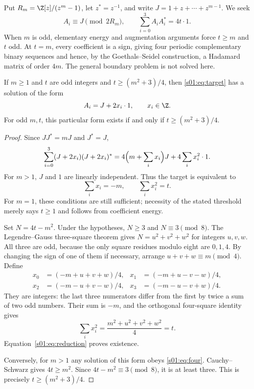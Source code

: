 



Put $R_m=\Z[z]/(z^m-1)$, let $z^*=z^{-1}$, and write
$J=1+z+\cdots+z^{m-1}$. We seek
\begin{equation}\label{s01:eq:target}
 A_i\equiv J\pmod{2R_m},\qquad
 \sum_{i=0}^3A_iA_i^*=4t\cdot1.
\end{equation}
When $m$ is odd, elementary energy and augmentation arguments force
$t\ge m$ and $t$ odd. At $t=m$, every coefficient is a sign, giving
four periodic complementary binary sequences and hence, by the
Goethals--Seidel construction, a Hadamard matrix of order $4m$.
The general boundary problem is not solved here.

\begin{theorem}\label{s01:thm:main}
If $m\ge1$ and $t$ are odd integers and $t\ge(m^2+3)/4$, then
\eqref{s01:eq:target} has a solution of the form
\[
 A_i=J+2x_i\cdot1,\qquad x_i\in\Z.
\]
For odd $m,t$, this particular form exists if and only if
$t\ge(m^2+3)/4$.
\end{theorem}
\begin{proof}
Since $JJ^*=mJ$ and $J^*=J$,
\begin{equation}\label{s01:eq:reduction}
 \sum_{i=0}^3(J+2x_i)(J+2x_i)^*
 =4\Bigl(m+\sum_i x_i\Bigr)J+4\sum_i x_i^2\cdot1.
\end{equation}
For $m>1$, $J$ and $1$ are linearly independent. Thus the target is
equivalent to
\begin{equation}\label{s01:eq:four}
 \sum_i x_i=-m,\qquad \sum_i x_i^2=t.
\end{equation}
For $m=1$, these conditions are still sufficient; necessity of the
stated threshold merely says $t\ge1$ and follows from coefficient energy.

Set $N=4t-m^2$. Under the hypotheses, $N\ge3$ and $N\equiv3\pmod8$.
The Legendre--Gauss three-square theorem gives
$N=u^2+v^2+w^2$ for integers $u,v,w$. All three are odd, because the
only square residues modulo eight are $0,1,4$. By changing the sign of
one of them if necessary, arrange
$u+v+w\equiv m\pmod4$. Define
\begin{align*}
 x_0&=(-m+u+v+w)/4,& x_1&=(-m+u-v-w)/4,\\
 x_2&=(-m-u+v-w)/4,& x_3&=(-m-u-v+w)/4.
\end{align*}
They are integers: the last three numerators differ from the first by
twice a sum of two odd numbers. Their sum is $-m$, and the orthogonal
four-square identity gives
\[
 \sum_i x_i^2=\frac{m^2+u^2+v^2+w^2}{4}=t.
\]
Equation~\eqref{s01:eq:reduction} proves existence.

Conversely, for $m>1$ any solution of this form obeys
\eqref{s01:eq:four}. Cauchy--Schwarz gives $4t\ge m^2$. Since
$4t-m^2\equiv3\pmod8$, it is at least three. This is precisely
$t\ge(m^2+3)/4$.
\end{proof}

